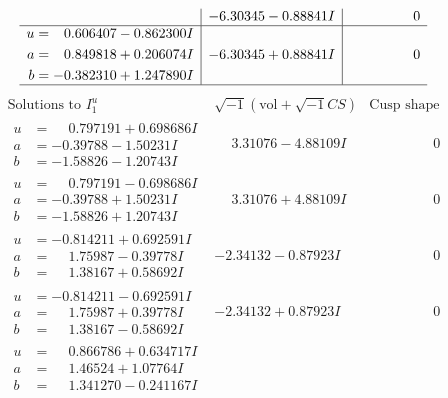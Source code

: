 \documentclass[1p]{elsarticle_modified}
\theoremstyle{definition}
\newcommand{\I}{\sqrt{-1}}
\begin{document}
$$\begin{array}{c|c|c}
 & -6.30345 - 0.88841 I & \phantom{-0.000000 } 0 \\ \hline\begin{aligned}
u &= \phantom{-}0.606407 - 0.862300 I \\
a &= \phantom{-}0.849818 + 0.206074 I \\
b &= -0.382310 + 1.247890 I\end{aligned}
 & -6.30345 + 0.88841 I & \phantom{-0.000000 } 0\\
 \hline 
 \end{array}$$\newpage$$\begin{array}{c|c|c}  
\text{Solutions to }I^u_{1}& \I (\text{vol} + \sqrt{-1}CS) & \text{Cusp shape}\\
 \hline 
\begin{aligned}
u &= \phantom{-}0.797191 + 0.698686 I \\
a &= -0.39788 - 1.50231 I \\
b &= -1.58826 - 1.20743 I\end{aligned}
 & \phantom{-}3.31076 - 4.88109 I & \phantom{-0.000000 } 0 \\ \hline\begin{aligned}
u &= \phantom{-}0.797191 - 0.698686 I \\
a &= -0.39788 + 1.50231 I \\
b &= -1.58826 + 1.20743 I\end{aligned}
 & \phantom{-}3.31076 + 4.88109 I & \phantom{-0.000000 } 0 \\ \hline\begin{aligned}
u &= -0.814211 + 0.692591 I \\
a &= \phantom{-}1.75987 - 0.39778 I \\
b &= \phantom{-}1.38167 + 0.58692 I\end{aligned}
 & -2.34132 - 0.87923 I & \phantom{-0.000000 } 0 \\ \hline\begin{aligned}
u &= -0.814211 - 0.692591 I \\
a &= \phantom{-}1.75987 + 0.39778 I \\
b &= \phantom{-}1.38167 - 0.58692 I\end{aligned}
 & -2.34132 + 0.87923 I & \phantom{-0.000000 } 0 \\ \hline\begin{aligned}
u &= \phantom{-}0.866786 + 0.634717 I \\
a &= \phantom{-}1.46524 + 1.07764 I \\
b &= \phantom{-}1.341270 - 0.241167 I\end{aligned}

\end{array}$$
\end{document}

